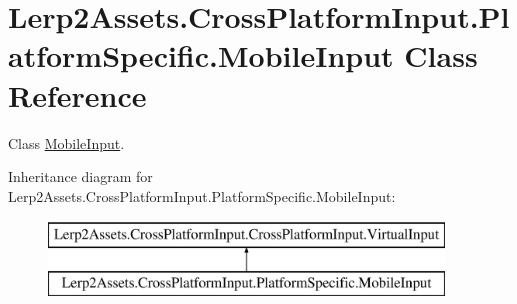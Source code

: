 \hypertarget{class_lerp2_assets_1_1_cross_platform_input_1_1_platform_specific_1_1_mobile_input}{}\section{Lerp2\+Assets.\+Cross\+Platform\+Input.\+Platform\+Specific.\+Mobile\+Input Class Reference}
\label{class_lerp2_assets_1_1_cross_platform_input_1_1_platform_specific_1_1_mobile_input}


Class \hyperlink{class_lerp2_assets_1_1_cross_platform_input_1_1_platform_specific_1_1_mobile_input}{Mobile\+Input}.  


Inheritance diagram for Lerp2\+Assets.\+Cross\+Platform\+Input.\+Platform\+Specific.\+Mobile\+Input\+:\begin{figure}[H]
\begin{center}
\leavevmode
\includegraphics[height=2.000000cm]{class_lerp2_assets_1_1_cross_platform_input_1_1_platform_specific_1_1_mobile_input}
\end{center}
\end{figure}

